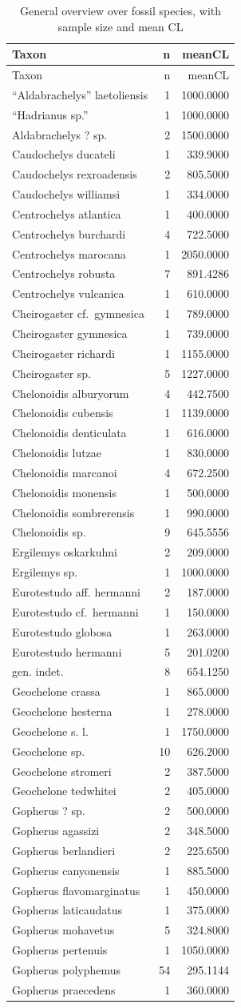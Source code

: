 \documentclass[]{article}
\begin{document}
\begin{longtable}[]{@{}lrr@{}}
\caption{General overview over fossil species, with sample size and mean
CL}\tabularnewline
\toprule
Taxon & n & meanCL\tabularnewline
\midrule
\endfirsthead
\toprule
Taxon & n & meanCL\tabularnewline
\midrule
\endhead
``Aldabrachelys'' laetoliensis & 1 & 1000.0000\tabularnewline
``Hadrianus sp.'' & 1 & 1000.0000\tabularnewline
Aldabrachelys ? sp. & 2 & 1500.0000\tabularnewline
Caudochelys ducateli & 1 & 339.9000\tabularnewline
Caudochelys rexroadensis & 2 & 805.5000\tabularnewline
Caudochelys williamsi & 1 & 334.0000\tabularnewline
Centrochelys atlantica & 1 & 400.0000\tabularnewline
Centrochelys burchardi & 4 & 722.5000\tabularnewline
Centrochelys marocana & 1 & 2050.0000\tabularnewline
Centrochelys robusta & 7 & 891.4286\tabularnewline
Centrochelys vulcanica & 1 & 610.0000\tabularnewline
Cheirogaster cf.~gymnesica & 1 & 789.0000\tabularnewline
Cheirogaster gymnesica & 1 & 739.0000\tabularnewline
Cheirogaster richardi & 1 & 1155.0000\tabularnewline
Cheirogaster sp. & 5 & 1227.0000\tabularnewline
Chelonoidis alburyorum & 4 & 442.7500\tabularnewline
Chelonoidis cubensis & 1 & 1139.0000\tabularnewline
Chelonoidis denticulata & 1 & 616.0000\tabularnewline
Chelonoidis lutzae & 1 & 830.0000\tabularnewline
Chelonoidis marcanoi & 4 & 672.2500\tabularnewline
Chelonoidis monensis & 1 & 500.0000\tabularnewline
Chelonoidis sombrerensis & 1 & 990.0000\tabularnewline
Chelonoidis sp. & 9 & 645.5556\tabularnewline
Ergilemys oskarkuhni & 2 & 209.0000\tabularnewline
Ergilemys sp. & 1 & 1000.0000\tabularnewline
Eurotestudo aff. hermanni & 2 & 187.0000\tabularnewline
Eurotestudo cf.~hermanni & 1 & 150.0000\tabularnewline
Eurotestudo globosa & 1 & 263.0000\tabularnewline
Eurotestudo hermanni & 5 & 201.0200\tabularnewline
gen. indet. & 8 & 654.1250\tabularnewline
Geochelone crassa & 1 & 865.0000\tabularnewline
Geochelone hesterna & 1 & 278.0000\tabularnewline
Geochelone s. l. & 1 & 1750.0000\tabularnewline
Geochelone sp. & 10 & 626.2000\tabularnewline
Geochelone stromeri & 2 & 387.5000\tabularnewline
Geochelone tedwhitei & 2 & 405.0000\tabularnewline
Gopherus ? sp. & 2 & 500.0000\tabularnewline
Gopherus agassizi & 2 & 348.5000\tabularnewline
Gopherus berlandieri & 2 & 225.6500\tabularnewline
Gopherus canyonensis & 1 & 885.5000\tabularnewline
Gopherus flavomarginatus & 1 & 450.0000\tabularnewline
Gopherus laticaudatus & 1 & 375.0000\tabularnewline
Gopherus mohavetus & 5 & 324.8000\tabularnewline
Gopherus pertenuis & 1 & 1050.0000\tabularnewline
Gopherus polyphemus & 54 & 295.1144\tabularnewline
Gopherus praecedens & 1 & 360.0000\tabularnewline

\end{longtable}
\end{document}
